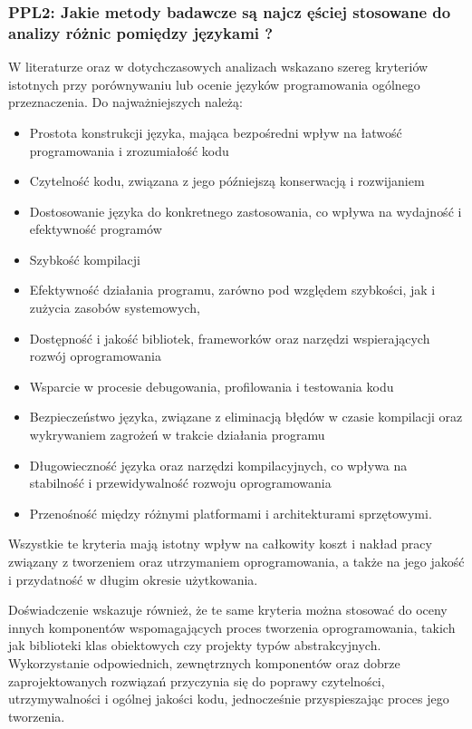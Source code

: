 \subsubsection{PPL2: Jakie metody badawcze są najcz
ęściej stosowane do analizy różnic pomiędzy językami ?}
W literaturze oraz w dotychczasowych analizach \cite{LanguageComparison_1,LanguageComparison_2,LanguageComparison_3,LanguageComparison_4} wskazano szereg kryteriów istotnych przy porównywaniu lub ocenie języków programowania ogólnego przeznaczenia. Do najważniejszych należą: 
    \begin{itemize}
        \item Prostota konstrukcji języka, mająca bezpośredni wpływ na łatwość programowania i zrozumiałość kodu
        \item Czytelność kodu, związana z jego późniejszą konserwacją i rozwijaniem
        \item Dostosowanie języka do konkretnego zastosowania, co wpływa na wydajność i efektywność programów
        \item Szybkość kompilacji
        \item Efektywność działania programu, zarówno pod względem szybkości, jak i zużycia zasobów systemowych,
        \item Dostępność i jakość bibliotek, frameworków oraz narzędzi wspierających rozwój oprogramowania
        \item Wsparcie w procesie debugowania, profilowania i testowania kodu
        \item Bezpieczeństwo języka, związane z eliminacją błędów w czasie kompilacji oraz wykrywaniem zagrożeń w trakcie działania programu
        \item Długowieczność języka oraz narzędzi kompilacyjnych, co wpływa na stabilność i przewidywalność rozwoju oprogramowania
        \item Przenośność między różnymi platformami i architekturami sprzętowymi.
    \end{itemize}
    Wszystkie te kryteria mają istotny wpływ na całkowity koszt i nakład pracy związany z tworzeniem oraz utrzymaniem oprogramowania, a także na jego jakość i przydatność w długim okresie użytkowania.

    Doświadczenie wskazuje również, że te same kryteria można stosować do oceny innych komponentów wspomagających proces tworzenia oprogramowania, takich jak biblioteki klas obiektowych czy projekty typów abstrakcyjnych. Wykorzystanie odpowiednich, zewnętrznych komponentów oraz dobrze zaprojektowanych rozwiązań przyczynia się do poprawy czytelności, utrzymywalności i ogólnej jakości kodu, jednocześnie przyspieszając proces jego tworzenia.

